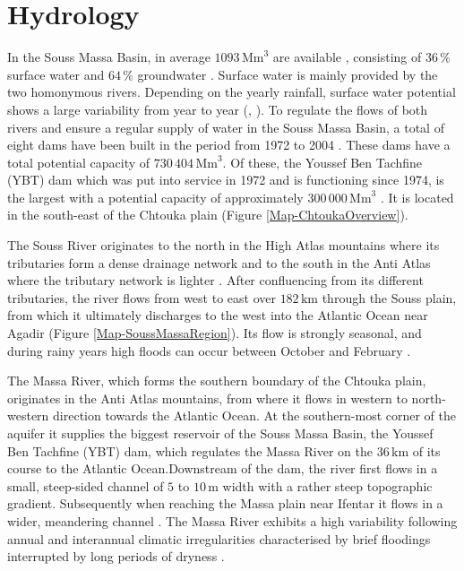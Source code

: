 \section{Hydrology}
\label{Sec-SouMaHydrology}

In the Souss Massa Basin, in average $1093 \, \textrm{Mm}^3$ are available \parencite{ABHSMD.2005}, consisting of $36 \, \%$ surface water and $64 \, \%$ groundwater \parencite{Choukr.2017}. 
Surface water is mainly provided by the two homonymous rivers. 
Depending on the yearly rainfall, surface water potential shows a large variability from year to year (\cite{Choukr.2017}, \cite{ABHSMD-HydStats.2022}). 
To regulate the flows of both rivers and ensure a regular supply of water in the Souss Massa Basin, a total of eight dams have been built in the period from 1972 to 2004 \parencite{Choukr.2017}. 
These dams have a total potential capacity of $730 \, 404 \, \textrm{Mm}^3$. Of these, the Youssef Ben Tachfine (YBT) dam which was put into service in 1972 and is functioning since 1974, is the largest with a potential capacity of approximately $300 \,000 \, \textrm{Mm}^3$ \parencite{ABHSM-Dams.2022}. 
It is located in the south-east of the Chtouka plain (Figure \ref{Map-ChtoukaOverview}).

The Souss River originates to the north in the High Atlas mountains where its tributaries form a dense drainage network and to the south in the Anti Atlas where the tributary network is lighter \parencite{Hssaisoune.2017}. 
After confluencing from its different tributaries, the river flows from west to east over $182 \, \textrm{km}$ through the Souss plain, from which it ultimately discharges to the west into the Atlantic Ocean near Agadir (Figure \ref{Map-SoussMassaRegion}). 
Its flow is strongly seasonal, and during rainy years high floods can occur between October and February \parencite{Hssaisoune.2017}.

The Massa River, which forms the southern boundary of the Chtouka plain, originates in the Anti Atlas mountains, from where it flows in western to north-western direction towards the Atlantic Ocean. 
At the southern-most corner of the aquifer it supplies the biggest reservoir of the Souss Massa Basin, the Youssef Ben Tachfine (YBT) dam, which regulates the Massa River on the $36 \, \textrm{km}$ of its course to the Atlantic Ocean.Downstream of the dam, the river first flows in a small, steep-sided channel of $5$ to $10 \, \textrm{m}$ width with a rather steep topographic gradient. Subsequently when reaching the Massa plain near Ifentar it flows in a wider, meandering channel \parencite{Horn.2021}. 
The Massa River exhibits a high variability following annual and interannual climatic irregularities characterised by brief floodings interrupted by long periods of dryness \parencite{Hssaisoune.2017}.

